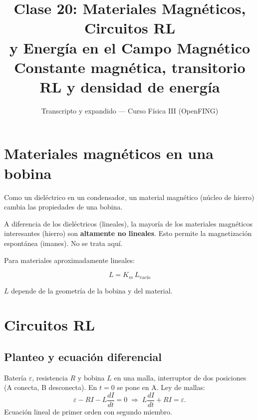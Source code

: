 \documentclass[12pt,a4paper]{article}
\title{\textbf{Clase 20: Materiales Magnéticos, Circuitos RL \\
        y Energía en el Campo Magnético}\\[0.3em]
        \large{Constante magnética, transitorio RL y densidad de energía}}
\author{Transcripto y expandido --- Curso Física III (OpenFING)}
\date{}
\begin{document}
\maketitle
\thispagestyle{empty}
\newpage

\tableofcontents
\newpage

\section{Materiales magnéticos en una bobina}

Como un dieléctrico en un condensador, un material magnético (núcleo de hierro)
cambia las propiedades de una bobina.

\begin{warnbox}[No lineales]
  A diferencia de los dieléctricos (lineales), la mayoría de los materiales
  magnéticos interesantes (hierro) son \textbf{altamente no lineales}. Esto
  permite la magnetización espontánea (imanes). No se trata aquí.
\end{warnbox}

Para materiales aproximadamente lineales:

\begin{keybox}
  \[
  \boxed{L = K_m\, L_{\text{vacío}}}
  \]
\end{keybox}

$L$ depende de la geometría de la bobina y del material.



\section{Circuitos RL}

\subsection{Planteo y ecuación diferencial}

Batería $\varepsilon$, resistencia $R$ y bobina $L$ en una malla, interruptor de
dos posiciones (A conecta, B desconecta). En $t=0$ se pone en A. Ley de mallas:
\[
\varepsilon - R I - L\frac{dI}{dt} = 0 \;\Longrightarrow\;
L\frac{dI}{dt} + R I = \varepsilon.
\]
Ecuación lineal de primer orden con segundo miembro.
\end{document}
